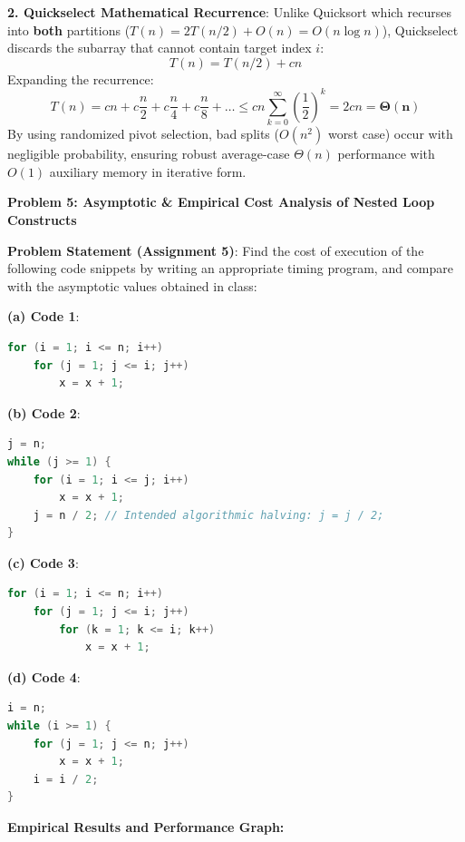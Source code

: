 \documentclass[12pt]{article}
\begin{document}
\textbf{2. Quickselect Mathematical Recurrence}:
Unlike Quicksort which recurses into \textbf{both} partitions ($T(n) = 2T(n/2) + O(n) = O(n \log n)$), Quickselect discards the subarray that cannot contain target index $i$:
\[
T(n) = T(n/2) + cn
\]
Expanding the recurrence:
\[
T(n) = cn + c\frac{n}{2} + c\frac{n}{4} + c\frac{n}{8} + \dots \le cn \sum_{k=0}^\infty \left(\frac{1}{2}\right)^k = 2cn = \mathbf{\Theta(n)}
\]
By using randomized pivot selection, bad splits ($O(n^2)$ worst case) occur with negligible probability, ensuring robust average-case $\Theta(n)$ performance with $O(1)$ auxiliary memory in iterative form.

\newpage

\begin{center}
\textbf{Problem 5: Asymptotic \& Empirical Cost Analysis of Nested Loop Constructs}
\end{center}

\textbf{Problem Statement (Assignment 5)}:
Find the cost of execution of the following code snippets by writing an appropriate timing program, and compare with the asymptotic values obtained in class:

\textbf{(a) Code 1}:
\begin{lstlisting}[language=C]
for (i = 1; i <= n; i++)
    for (j = 1; j <= i; j++)
        x = x + 1;
\end{lstlisting}

\textbf{(b) Code 2}:
\begin{lstlisting}[language=C]
j = n;
while (j >= 1) {
    for (i = 1; i <= j; i++)
        x = x + 1;
    j = n / 2; // Intended algorithmic halving: j = j / 2;
}
\end{lstlisting}

\textbf{(c) Code 3}:
\begin{lstlisting}[language=C]
for (i = 1; i <= n; i++)
    for (j = 1; j <= i; j++)
        for (k = 1; k <= i; k++)
            x = x + 1;
\end{lstlisting}

\textbf{(d) Code 4}:
\begin{lstlisting}[language=C]
i = n;
while (i >= 1) {
    for (j = 1; j <= n; j++)
        x = x + 1;
    i = i / 2;
}
\end{lstlisting}

\vspace{0.2cm}
\textbf{Empirical Results and Performance Graph:}
\end{document}

